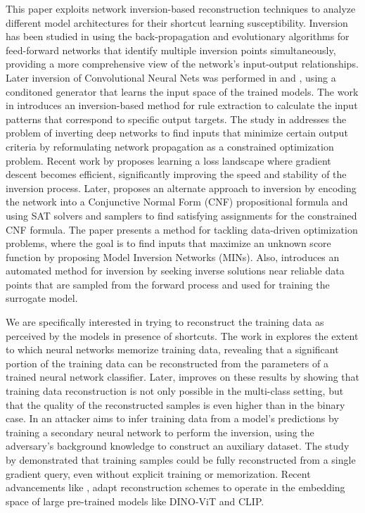 This paper exploits network inversion-based reconstruction techniques to analyze different model architectures for their shortcut learning susceptibility. Inversion has been studied in \cite{KINDERMANN1990277,784232} using the back-propagation and evolutionary algorithms for feed-forward networks that identify multiple inversion points simultaneously, providing a more comprehensive view of the network’s input-output relationships. Later inversion of Convolutional Neural Nets was performed in \cite{suhail2024networkcnn} and \cite{suhail2024networkinversionapplications}, using a conditoned generator that learns the input space of the trained models. The work in \cite{SAAD200778} introduces an inversion-based method for rule extraction to calculate the input patterns that correspond to specific output targets. The study in \cite{Wong2017NeuralNI} addresses the problem of inverting deep networks to find inputs that minimize certain output criteria by reformulating network propagation as a constrained optimization problem. Recent work by \cite{liu2022landscapelearningneuralnetwork} proposes learning a loss landscape where gradient descent becomes efficient, significantly improving the speed and stability of the inversion process. Later, \cite{suhail2024network} proposes an alternate approach to inversion by encoding the network into a Conjunctive Normal Form (CNF) propositional formula and using SAT solvers and samplers to find satisfying assignments for the constrained CNF formula. The paper \cite{NEURIPS2020_373e4c5d} presents a method for tackling data-driven optimization problems, where the goal is to find inputs that maximize an unknown score function by proposing Model Inversion Networks (MINs). Also, \cite{ansari2022autoinverseuncertaintyawareinversion} introduces an automated method for inversion by seeking inverse solutions near reliable data points that are sampled from the forward process and used for training the surrogate model.

We are specifically interested in trying to reconstruct the training data as perceived by the models in presence of shortcuts. The work in \cite{haim2022reconstructingtrainingdatatrained} explores the extent to which neural networks memorize training data, revealing that a significant portion of the training data can be reconstructed from the parameters of a trained neural network classifier. Later, \cite{buzaglo2023reconstructingtrainingdatamulticlass} improves on these results by showing that training data reconstruction is not only possible in the multi-class setting, but that the quality of the reconstructed samples is even higher than in the binary case. In \cite{10.1145/3319535.3354261} an attacker aims to infer training data from a model's predictions by training a secondary neural network to perform the inversion, using the adversary's background knowledge to construct an auxiliary dataset. The study by \cite{wang2023reconstructingtrainingdatamodel, pmlr-v206-wang23g, 9833677} demonstrated that training samples could be fully reconstructed from a single gradient query, even without explicit training or memorization. Recent advancements like \cite{oz2024reconstructingtrainingdatareal}, adapt reconstruction schemes to operate in the embedding space of large pre-trained models like DINO-ViT and CLIP.

